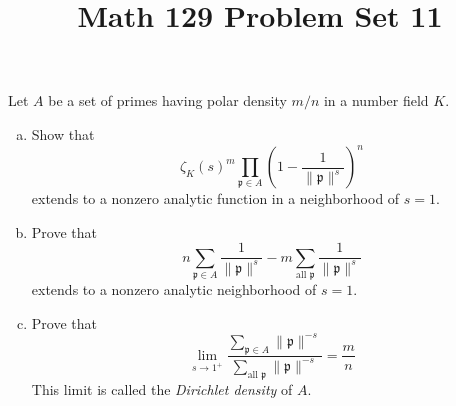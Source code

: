\documentclass[11pt,letterpaper]{article}
\title{\textbf{Math 129 Problem Set 11}}
\begin{document}
\maketitle


\begin{cproblem}{7.7}
    Let $A$ be a set of primes having polar density $m/n$ in a number field $K$.
    \begin{enumerate}[(a)]
        \item Show that
            \[
                \zeta_K(s)^m\prod_{\mathfrak{p}\in A}\left(1-\frac{1}{\|\mathfrak{p}\|^s}\right)^n
            \] 
            extends to a nonzero analytic function in a neighborhood of $s=1$.
        \item Prove that
            \[
                n\sum_{\mathfrak{p}\in A}\frac{1}{\|\mathfrak{p}\|^s}-m\sum_{\textrm{all }\mathfrak{p}}\frac{1}{\|\mathfrak{p}\|^s}
            \] 
            extends to a nonzero analytic neighborhood of $s=1$. 
        \item Prove that 
            \[
                \lim_{s\to 1^+}\frac{\sum_{\mathfrak{p}\in A}{\|\mathfrak{p}\|^{-s}}}{\sum_{\textrm{all }\mathfrak{p}}{\|\mathfrak{p}\|^{-s}}}=\frac{m}{n}
            \] 
            This limit is called the \emph{Dirichlet density} of $A$.
    \end{enumerate}
\end{cproblem}
\end{document}
